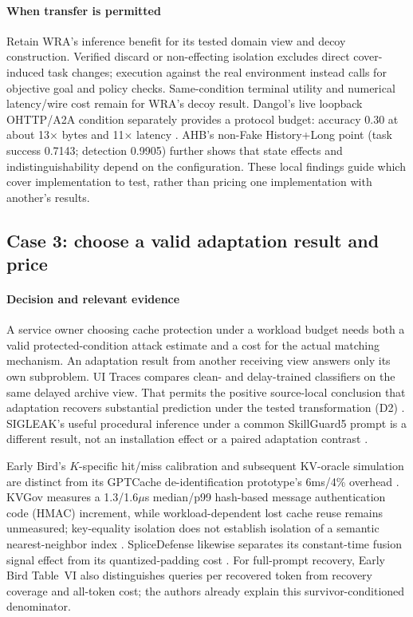 \paragraph{When transfer is permitted}
Retain WRA's inference benefit for its tested domain view and decoy construction. Verified discard or non-effecting isolation excludes direct cover-induced task changes; execution against the real environment instead calls for objective goal and policy checks. Same-condition terminal utility and numerical latency/wire cost remain \NRR{} for WRA's decoy result. Dangol's live loopback OHTTP/A2A condition separately provides a protocol budget: accuracy 0.30 at about 13$\times$ bytes and 11$\times$ latency \cite{dangol2026workflow}. AHB's non-Fake History+Long point (task success 0.7143; detection 0.9905) further shows that state effects and indistinguishability depend on the configuration. These local findings guide which cover implementation to test, rather than pricing one implementation with another's results.

\subsection{Case 3: choose a valid adaptation result and price}
\paragraph{Decision and relevant evidence}
A service owner choosing cache protection under a workload budget needs both a valid protected-condition attack estimate and a cost for the actual matching mechanism. An adaptation result from another receiving view answers only its own subproblem. UI Traces compares clean- and delay-trained classifiers on the same delayed archive view. That permits the positive source-local conclusion that adaptation recovers substantial prediction under the tested transformation (D2) \cite{uitraces2026}. SIGLEAK's useful procedural inference under a common SkillGuard5 prompt is a different result, not an installation effect or a paired adaptation contrast \cite{geng2026sigleak}.

Early Bird's $K$-specific hit/miss calibration and subsequent KV-oracle simulation are distinct from its GPTCache de-identification prototype's 6ms/4\% overhead \cite{earlybird2025}. KVGov measures a 1.3/1.6$\mu$s median/p99 hash-based message authentication code (HMAC) increment, while workload-dependent lost cache reuse remains unmeasured; key-equality isolation does not establish isolation of a semantic nearest-neighbor index \cite{addagada2026kvgov}. SpliceDefense likewise separates its constant-time fusion signal effect from its quantized-padding cost \cite{spliceleak2026}. For full-prompt recovery, Early Bird Table~VI also distinguishes queries per recovered token from recovery coverage and all-token cost; the authors already explain this survivor-conditioned denominator.


